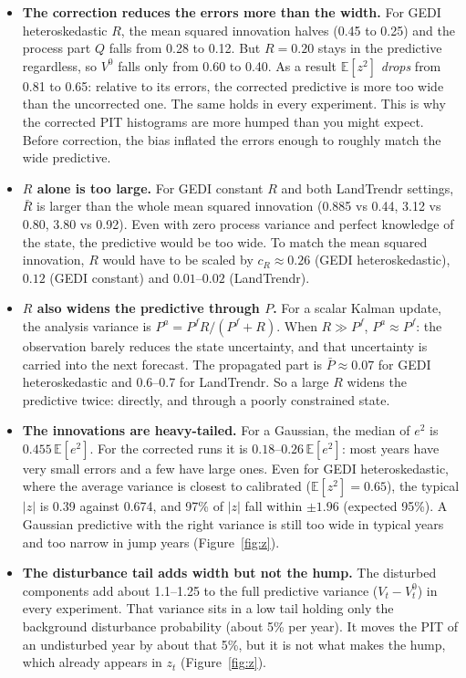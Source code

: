 \documentclass[11pt]{article}
\newcommand{\E}{\mathbb{E}}
\begin{document}
\begin{itemize}
  \item \textbf{The correction reduces the errors more than the width.} For GEDI heteroskedastic $R$, the mean squared
  innovation halves (0.45 to 0.25) and the process part $Q$ falls from 0.28 to 0.12.
  But $R = 0.20$ stays in the predictive regardless, so $V^0$ falls only from 0.60 to 0.40. As a result $\E[z^2]$
  \emph{drops} from 0.81 to 0.65: relative to its errors, the corrected predictive is more too wide
  than the uncorrected one. The same holds in every experiment. This is why the corrected
  PIT histograms are more humped than you might expect. Before correction, the bias inflated the
  errors enough to roughly match the wide predictive.
  \item \textbf{$R$ alone is too large.} For GEDI constant $R$ and both LandTrendr settings, $\bar R$ is larger than
  the whole mean squared innovation (0.885 vs 0.44, 3.12 vs 0.80, 3.80 vs 0.92). Even with
  zero process variance and perfect knowledge of the state, the predictive would be too wide.
  To match the mean squared innovation, $R$ would have to be scaled by $c_R \approx 0.26$
  (GEDI heteroskedastic), $0.12$ (GEDI constant) and $0.01$--$0.02$ (LandTrendr).
  \item \textbf{$R$ also widens the predictive through $P$.} For a scalar Kalman update, the analysis
  variance is $P^a = P^f R/(P^f + R)$. When $R \gg P^f$, $P^a \approx P^f$: the
  observation barely reduces the state uncertainty, and that uncertainty is carried into the
  next forecast. The propagated part is $\bar P \approx 0.07$ for GEDI heteroskedastic and 0.6--0.7
  for LandTrendr. So a large $R$ widens the predictive twice: directly, and through a poorly constrained
  state.
  \item \textbf{The innovations are heavy-tailed.} For a Gaussian, the median of $e^2$ is $0.455\,\E[e^2]$. For the
  corrected runs it is $0.18$--$0.26\,\E[e^2]$: most years have very small
  errors and a few have large ones. Even for GEDI heteroskedastic, where the average variance is
  closest to calibrated ($\E[z^2] = 0.65$), the typical $|z|$ is 0.39 against 0.674, and 97\% of $|z|$
  fall within $\pm 1.96$ (expected 95\%). A Gaussian predictive with the right variance is still too
  wide in typical years and too narrow in jump years (Figure~\ref{fig:z}).
  \item \textbf{The disturbance tail adds width but not the hump.} The disturbed components add about
  1.1--1.25 to the full predictive variance ($V_t - V^0_t$) in every experiment. That variance sits in
  a low tail holding only the background disturbance probability (about 5\% per
  year). It moves the PIT of an undisturbed year by about that 5\%, but it is not what makes the
  hump, which already appears in $z_t$ (Figure~\ref{fig:z}).
\end{itemize}
\end{document}
